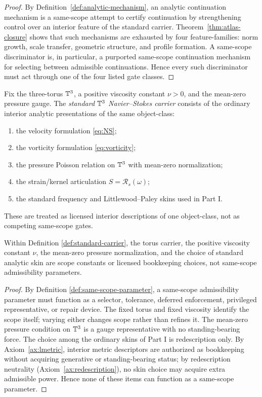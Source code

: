 \begin{proof}
By Definition~\ref{def:analytic-mechanism}, an analytic continuation mechanism is a same-scope attempt
to certify continuation by strengthening control over an interior feature of the standard carrier.
Theorem~\ref{thm:atlas-closure} shows that such mechanisms are exhausted by four feature-families:
norm growth, scale transfer, geometric structure, and profile formation.
A same-scope discriminator is, in particular, a purported same-scope continuation mechanism for
selecting between admissible continuations. Hence every such discriminator must act through one of the
four listed gate classes.
\end{proof}
\begin{definition}\label{def:standard-carrier}
Fix the three-torus $\mathbb{T}^3$, a positive viscosity constant $\nu>0$, and the mean-zero pressure gauge.
The \emph{standard $\mathbb{T}^3$ Navier--Stokes carrier} consists of the ordinary interior analytic
presentations of the same object-class:
\begin{enumerate}[label=(\roman*), leftmargin=2.2em]
\item the velocity formulation \eqref{eq:NS};
\item the vorticity formulation \eqref{eq:vorticity};
\item the pressure Poisson relation on $\mathbb{T}^3$ with mean-zero normalization;
\item the strain/kernel articulation $S=\mathcal R_s(\omega)$;
\item the standard frequency and Littlewood--Paley skins used in Part I.
\end{enumerate}
These are treated as licensed interior descriptions of one object-class, not as competing same-scope
gates.
\end{definition}

\begin{lemma}\label{prop:scope-constants}
Within Definition \ref{def:standard-carrier}, the torus carrier, the positive viscosity constant $\nu$,
the mean-zero pressure normalization, and the choice of standard analytic skin are scope constants or
licensed bookkeeping choices, not same-scope admissibility parameters.
\end{lemma}

\begin{proof}
By Definition \ref{def:same-scope-parameter}, a same-scope admissibility parameter must function as
a selector, tolerance, deferred enforcement, privileged representative, or repair device. The fixed torus and fixed viscosity identify the scope
itself; varying either changes scope rather than refines it. The mean-zero pressure condition on
$\mathbb{T}^3$ is a gauge representative with no standing-bearing force. The choice among the ordinary skins
of Part I is redescription only. By Axiom~\ref{ax:lmetric}, interior metric descriptors are authorized as bookkeeping without acquiring
generative or standing-bearing status; by redescription neutrality (Axiom~\ref{ax:redescription}), no
skin choice may acquire extra admissible power. Hence none of these items can function as a same-scope
parameter. 
\end{proof}

